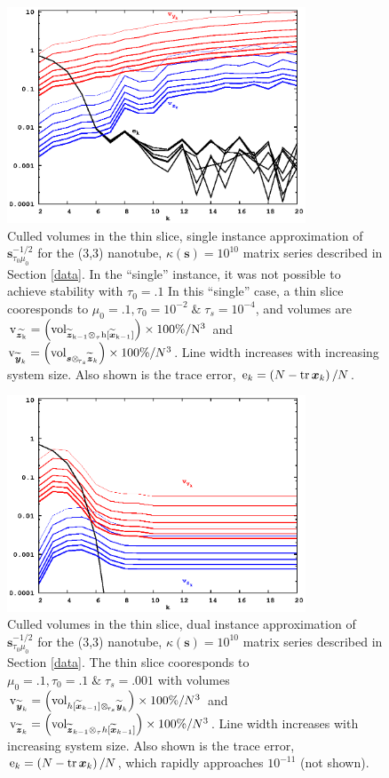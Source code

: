 \documentclass[letterpaper,twocolumn,amsmath,amsfont,amssymb,english,aps,jcp,preprintnumbers,groupaddress,nofootinbib,tightenlines,floatfix]{revtex4}
\newcommand{\mat}[1]{\boldsymbol{#1}}
\newcommand{\ot}{  {\scriptstyle \otimes}_{ \tau } }
\newcommand{\ots}{ {\scriptstyle \otimes}_{ \! \tau_s } }
\theoremstyle{plain}
\theoremstyle{remark}
\theoremstyle{plain}
\begin{document}
\begin{figure}[h]\label{regularized_stab}
 \includegraphics[width=3.5in]{fig_33_tube_cond_10_regularized/33_tube_k10_regularized_stab.eps}
\caption{
Culled volumes in the thin slice, single instance approximation of $\mat{s}^{-1/2}_{\tau_0 \mu_0}$
for the (3,3) nanotube, $\kappa(\mat{s})=10^{10}$ matrix series 
described in Section \ref{data}.  In the ``single'' instance, it was not possible to achieve stability with $\tau_0=.1$
In this ``single'' case, a thin slice cooresponds to $\mu_0=.1, \tau_0=10^{-2} \;  \&  \; \tau_s=10^{-4}$, and volumes are
$\rm v_{\widetilde{\mat{z}_k}} = \left( {\rm vol}_{ \widetilde{\mat{z}}_{k-1}\ot h[\widetilde{\mat{x}}_{k-1}] } \right) \times 100\% /N^3$ and
${\rm v}_{\widetilde{\mat{y}}_k} = \left( {\rm vol}_{\mat{s}  \ots  \widetilde{\mat{z}}_{k}} \right) \times 100\% /N^3$.    
Line width increases with increasing system size. 
Also shown is the trace error, ${\rm e}_{k} = \left( N-{\rm tr}\,\mat{x}_k \right)/N$.}
\end{figure} 
\begin{figure}[h]\label{regularized_dual}
 \includegraphics[width=3.5in]{fig_33_tube_cond_10_regularized/33_tube_k10_regularized_dual.eps}
\caption{
Culled volumes in the thin slice, dual instance approximation of $\mat{s}^{-1/2}_{\tau_0 \mu_0}$
for the (3,3) nanotube, $\kappa(\mat{s})=10^{10}$ matrix series 
described in Section \ref{data}. The thin slice cooresponds to $\mu_0=.1, \tau_0=.1 \;  \&  \; \tau_s=.001$ 
with volumes 
${\rm v}_{\widetilde{\mat{y}}_k}= \left( {\rm vol}_{  h[\widetilde{\mat{x}}_{k-1}] \ots \widetilde{\mat{y}}_k }  \right) \times 100\% /N^3$ and  
${\rm v}_{\widetilde{\mat{z}}_k}= \left( {\rm vol}_{\widetilde{\mat{z}}_{k-1} \ot  h[\widetilde{\mat{x}}_{k-1}]} \right) \times 100\% /N^3$.
Line width increases with increasing system size. 
Also shown is the trace error, ${\rm e}_{k} = \left( N-{\rm tr}\,\mat{x}_k \right)/N$, which rapidly approaches $10^{-11}$ (not shown). }
\end{figure} 
\end{document}
